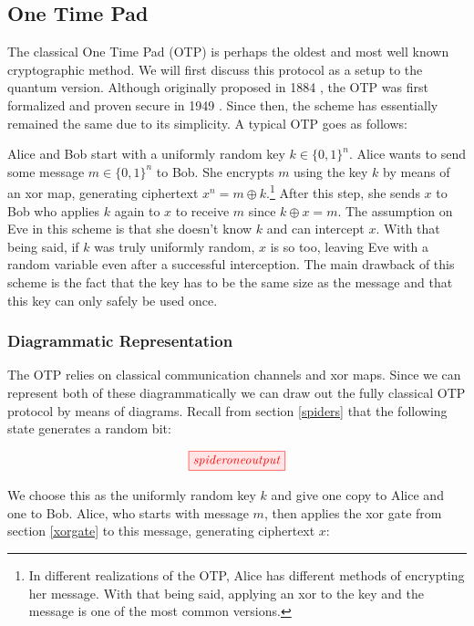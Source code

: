 \documentclass[]{article}
\begin{document}
\subsection{One Time Pad}

The classical One Time Pad (OTP) is perhaps the oldest and most well known cryptographic method. We will first discuss this protocol as a setup to the quantum version. Although originally proposed in 1884 \cite{Markoff2011}, the OTP was first formalized and proven secure in 1949 \cite{Shannon1949}. Since then, the scheme has essentially remained the same due to its simplicity. A typical OTP goes as follows:

Alice and Bob start with a uniformly random key $k \in \{0,1\}^n$. Alice wants to send some message $m \in \{0,1\}^n$ to Bob. She encrypts $m$ using the key $k$ by means of an xor map, generating ciphertext $x^n = m \oplus k$.\footnote{In different realizations of the OTP, Alice has different methods of encrypting her message. With that being said, applying an xor to the key and the message is one of the most common versions.} After this step, she sends $x$ to Bob who applies $k$ again to $x$ to receive $m$ since $k \oplus x = m$. The assumption on Eve in this scheme is that she doesn't know $k$ and can intercept $x$. With that being said, if $k$ was truly uniformly random, $x$ is so too, leaving Eve with a random variable even after a successful interception. The main drawback of this scheme is the fact that the key has to be the same size as the message and that this key can only safely be used once.

\subsubsection{Diagrammatic Representation}

The OTP relies on classical communication channels and xor maps. Since we can represent both of these diagrammatically we can draw out the fully classical OTP protocol by means of diagrams. Recall from section \ref{spiders} that the following state generates a random bit:

\begin{equation}
	\tikzfig{spideroneoutput}
\end{equation}

We choose this as the uniformly random key $k$ and give one copy to Alice and one to Bob. Alice, who starts with message $m$, then applies the xor gate from section \ref{xorgate} to this message, generating ciphertext $x$:
\end{document}
